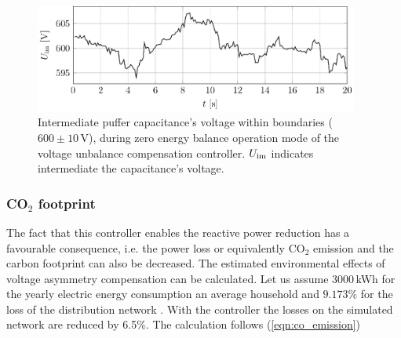             \begin{figure}[ht]
            \centering
            \includegraphics[width=0.95\textwidth]{Unblance_EPS_Pics/UnbalRedComp_JCP-figure7.eps}
                 \caption{Intermediate puffer capacitance's voltage within boundaries ($600\pm10$\,V), during zero energy balance operation mode of the voltage unbalance compensation controller. $U_{\textnormal{im}}$ indicates intermediate the capacitance's voltage.}
                 \label{fig:u_inter}
                \end{figure}

%

        \subsubsection[CO2 footprint]{CO$_2$ footprint}

            The fact that this controller enables the reactive power reduction has a favourable consequence, i.e. the power loss or equivalently CO$_2$ emission and the carbon footprint can also be decreased. The estimated environmental effects of voltage asymmetry compensation can be calculated. Let us assume 3000\,kWh for the yearly electric energy consumption an average household and $9.173\%$ for the loss of the distribution network \cite{MVM2013}. With the controller the losses on the simulated network are reduced by 6.5\%. The calculation follows (\ref{eqn:co_emission})

